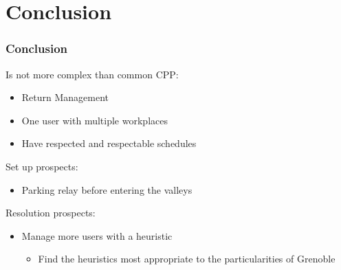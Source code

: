 \documentclass{beamer}
\begin{document}
	\section*{Conclusion}
	\begin{frame}
		\frametitle{Conclusion}
		Is not more complex than common CPP:
		\begin{itemize}
			\item Return Management
			\item One user with multiple workplaces
			\item Have respected and respectable schedules
		\end{itemize}
		Set up prospects:
		\begin{itemize}
			\item Parking relay before entering the valleys
		\end{itemize}
		Resolution prospects:
		\begin{itemize}
			\item Manage more users with a heuristic
			\begin{itemize}
				\item Find the heuristics most appropriate to the particularities of Grenoble
			\end{itemize}
		\end{itemize}
	\end{frame}
\end{document}
